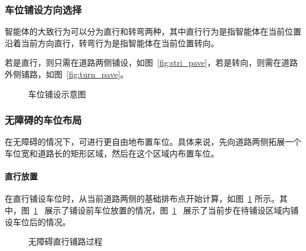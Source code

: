 \subsubsection{车位铺设方向选择}
智能体的大致行为可以分为直行和转弯两种，其中直行行为是指智能体在当前位置沿着当前方向直行，转弯行为是指智能体在当前位置转向。

若是直行，则只需在道路两侧铺设，如图~\ref{fig:stri_pave}，若是转向，则需在道路外侧铺路，如图~\ref{fig:turn_pave}。
\begin{figure}[!htb]
    \centering
	\hspace{2cm}
    \caption{车位铺设示意图}
\end{figure}

\subsubsection{无障碍的车位布局}
\label{section:no_obstacle}
在无障碍的情况下，可进行更自由地布置车位。具体来说，先向道路两侧拓展一个车位宽和道路长的矩形区域，然后在这个区域内布置车位。
\paragraph{直行放置}
在直行铺设车位时，从当前道路两侧的基础排布点开始计算，如图~\ref{fig:stri_pave_pro} 所示。其中，图~\ref{fig:stri_pave_pro}~ 展示了铺设前车位放置的情况，图~\ref{fig:stri_pave_pro}~ 展示了当前步在待铺设区域内铺设车位后的情况。
\begin{figure}[!htb]
    \centering
	\hspace{1cm}
    \caption{\label{fig:stri_pave_pro}无障碍直行铺路过程}
\end{figure}

